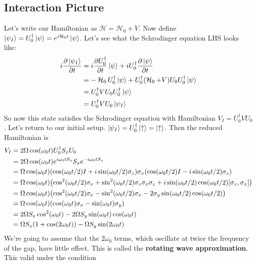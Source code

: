 \subsection{Interaction Picture}
Let's write our Hamiltonian as $\mathcal{H} = \mathcal{H}_0 + V$.
Now define $\ket{\psi_I} = U_0^{\dagger} \ket{\psi} = e^{i \mathcal{H}_0 t} \ket{\psi}$. Let's
see what the Schrodinger equation LHS looks like:
\begin{align*}
    i \pdv{\ket{\psi_I}}{t} &= i \pdv{U_0^{\dagger}}{t} \ket{\psi} + i U_0^{\dagger} \pdv{\ket{\psi}}{t} \\
    &= - \operatorname{\mathcal{H}}_0 U_0^{\dagger} \ket{\psi} + U_0^{\dagger}\qty(\operatorname{\mathcal{H}}_0 + V) U_0 U_0^{\dagger} \ket{\psi} \\
    &= U_0^{\dagger} V U_0 U_0^{\dagger} \ket{\psi} \\
    &= U_0^{\dagger} V U_0 \ket{\psi_I}
\end{align*}
So now this state satisfies the Schrodinger equation with Hamiltonian $V_I = U_0^{\dagger} V U_0$. Let's return
to our initial setup. $\ket{\psi_I} = U_0^{\dagger} \ket{\uparrow} = \ket{\uparrow}$. Then the reduced Hamiltonian is
\begin{align*}
    V_I &= 2 \Omega \cos(\omega_0 t) U_0^{\dagger} S_x U_0 \\
    &=  2 \Omega \cos(\omega_0 t) e^{i \omega_0 t S_z} S_x e^{-i\omega_0 t S_z} \\
    &=  \Omega \cos(\omega_0 t) \qty(\cos(\omega_0 t/2) I + i \sin(\omega_0 t/2) \sigma_z) \sigma_x \qty(\cos(\omega_0 t/2) I - i \sin(\omega_0 t/2) \sigma_z) \\
    &= \Omega \cos(\omega_0 t) \qty(\cos^2(\omega_0 t/2) \sigma_x + \sin^2(\omega_0 t/2) \sigma_z \sigma_x \sigma_z + i \sin(\omega_0 t/2) \cos(\omega_0 t/2) [\sigma_z, \sigma_x]) \\
    &=  \Omega \cos(\omega_0 t)\qty(\cos^2(\omega_0 t/2) \sigma_x - \sin^2(\omega_0 t/2) \sigma_x - 2 \sigma_y \sin(\omega_0 t/2) \cos(\omega_0 t/2)) \\
    &= \Omega \cos(\omega_0 t) \qty(\cos(\omega_0 t) \sigma_x - \sin(\omega_0 t) \sigma_y) \\
    &= 2 \Omega S_x \cos^2(\omega_0 t) - 2 \Omega S_y \sin(\omega_0 t) \cos(\omega_0 t) \\
    &= \Omega S_x (1 + \cos(2 \omega_0 t)) - \Omega S_y \sin(2 \omega_0 t)
\end{align*}
We're going to assume that the $2 \omega_0$ terms, which oscillate at twice the frequency of the gap,
have little effect. This is called the \textbf{rotating wave approximation}. This valid under the condition
